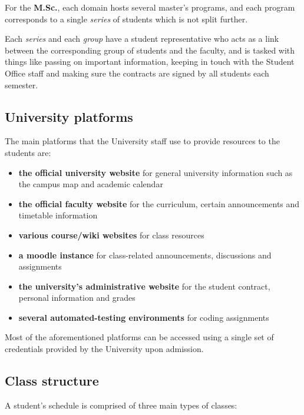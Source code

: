         For the \textbf{M.Sc.}, each domain hosts several master's programs, and each program corresponds to a single \textit{series} of students which is not split further.
        
        Each \textit{series} and each \textit{group} have a student representative who acts as a link between the corresponding group of students and the faculty, and is tasked with things like passing on important information, keeping in touch with the Student Office staff and making sure the contracts are signed by all students each semester.
    
    \subsection{University platforms} \label{1:university_platforms}
    
        The main platforms that the University staff use to provide resources to the students are:
        
        \begin{itemize}
            \item \textbf{the official university website} for general university information such as the campus map and academic calendar
            \item \textbf{the official faculty website} for the curriculum, certain announcements and timetable information
            \item \textbf{various course/wiki websites} for class resources
            \item \textbf{a \gls{moodle} instance} for class-related announcements, discussions and assignments
            \item \textbf{the university's administrative website} for the student contract, personal information and grades
            \item \textbf{several automated-testing environments} for coding assignments
        \end{itemize}
    
        Most of the aforementioned platforms can be accessed using a single set of credentials provided by the University upon admission.
        
    \subsection{Class structure} \label{1:class_structure}
    
    A student's schedule is comprised of three main types of classes:
    
